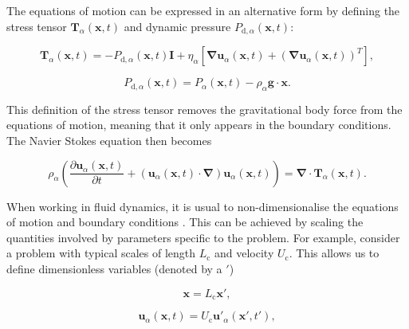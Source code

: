 \documentclass[12pt]{article}
\begin{document}
The equations of motion can be expressed in an alternative form by defining the stress tensor $\boldsymbol{T}_{\alpha}(\boldsymbol{x},t)$ \citep{Manga94} and dynamic pressure $P_{\text{d},\alpha}(\boldsymbol{x},t)$:

\begin{equation}
\label{equ:stress}
\boldsymbol{T}_{\alpha}(\boldsymbol{x},t) = -P_{\text{d},\alpha}(\boldsymbol{x},t)  \boldsymbol{I} + \eta_{\alpha}[\boldsymbol\nabla \boldsymbol{u}_{\alpha}(\boldsymbol{x},t) + (\boldsymbol\nabla \boldsymbol{u}_{\alpha}(\boldsymbol{x},t))^{T}], 
\end{equation}

\begin{equation}
\label{equ:dyn_P}
P_{\text{d},\alpha}(\boldsymbol{x},t) = P_{\alpha}(\boldsymbol{x},t) - \rho_{\alpha} \boldsymbol{g} \cdot \boldsymbol{x} .
\end{equation}

This definition of the stress tensor removes the gravitational body force from the equations of motion, meaning that it only appears in the boundary conditions. The Navier Stokes equation then becomes

\begin{equation}
\label{equ:NS_stress}
\rho_{\alpha} \left( \frac{\partial \boldsymbol{u}_{\alpha}(\boldsymbol{x},t)}{\partial t} + (\boldsymbol{u}_{\alpha}(\boldsymbol{x},t) \cdot \boldsymbol\nabla) \boldsymbol{u}_{\alpha}(\boldsymbol{x},t) \right) = \boldsymbol\nabla \cdot \boldsymbol{T}_{\alpha}(\boldsymbol{x},t) .
\end{equation}

When working in fluid dynamics, it is usual to non-dimensionalise the equations of motion and boundary conditions \citep{White99}. This can be achieved by scaling the quantities involved by parameters specific to the problem. For example, consider a problem with typical scales of length $L_{\text{c}}$ and velocity $U_{\text{c}}$. This allows us to define dimensionless variables (denoted by a $'$)

\begin{equation} 
\label{equ:nodim_l}
\boldsymbol{x} = L_{\text{c}} \boldsymbol{x'} ,
\end{equation}

\begin{equation}
\label{equ:nodim_u}
\boldsymbol{u}_{\alpha}(\boldsymbol{x},t) = U_{\text{c}} \boldsymbol{u'}_{\alpha}(\boldsymbol{x'},t') ,
\end{equation}
\end{document}
